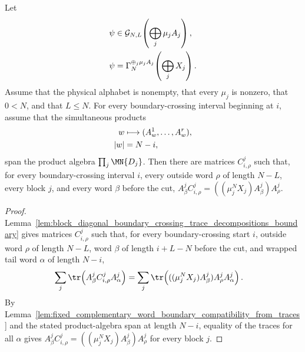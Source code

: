 \begin{lemma}
    \label{thm:block_diagonal_boundary_crossing_pgvwc_comparison_chain_ground_space}
    \leanok
    Let
    \begin{align}
        \psi
         & \in
        \mathcal G_{N,L}\!\left(\bigoplus_j\mu_jA_j\right),
        \notag \\
        \psi
         & =
        \Gamma_N^{\oplus_j\mu_jA_j}\!\left(\bigoplus_jX_j\right).
        \notag
    \end{align}
    Assume that the physical alphabet is nonempty, that every $\mu_j$ is
    nonzero, that $0<N$, and that $L\le N$. For every boundary-crossing
    interval beginning at $i$, assume that the simultaneous products
    \begin{align}
        w   & \longmapsto (A^1_w,\ldots,A^r_w),
        \notag                                  \\
        |w| & =N-i,
        \notag
    \end{align}
    span the product algebra $\prod_j\MN{D_j}$. Then there are matrices
    $C^j_{i,\rho}$ such that, for every boundary-crossing interval $i$, every
    outside word $\rho$ of length $N-L$, every block $j$, and every word
    $\beta$ before the cut,
    $A^j_\beta C^j_{i,\rho} = ((\mu_j^NX_j)A^j_\beta)A^j_\rho$.
\end{lemma}

\begin{proof}
    \leanok
    Lemma~\ref{lem:block_diagonal_boundary_crossing_trace_decompositions_boundary}
    gives matrices $C^j_{i,\rho}$ such that, for every boundary-crossing start
    $i$, outside word $\rho$ of length $N-L$, word $\beta$ of length
    $i+L-N$ before the cut, and wrapped tail word $\alpha$ of length $N-i$,
    \begin{align}
        \sum_j\tr\!\left(A^j_\beta C^j_{i,\rho}A^j_\alpha\right)
         & =
        \sum_j\tr\!\left(((\mu_j^NX_j)A^j_\beta)A^j_\rho A^j_\alpha\right).
        \notag
    \end{align}
    By
    Lemma~\ref{lem:fixed_complementary_word_boundary_compatibility_from_traces}
    and the stated product-algebra span at length $N-i$, equality of the
    traces for all $\alpha$ gives
    $A^j_\beta C^j_{i,\rho}=((\mu_j^NX_j)A^j_\beta)A^j_\rho$ for every block
    $j$.
\end{proof}

